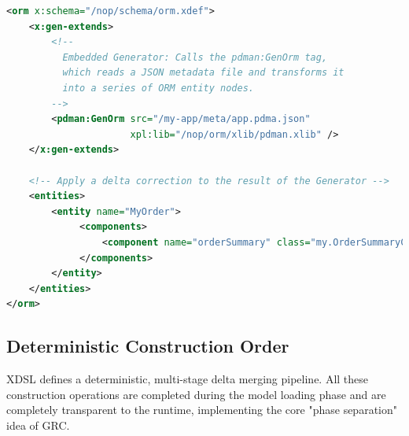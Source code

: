 \documentclass[11pt]{article}
\begin{document}
\begin{lstlisting}[language=XML, caption={Model with an embedded generator}]
<orm x:schema="/nop/schema/orm.xdef">
    <x:gen-extends>
        <!--
          Embedded Generator: Calls the pdman:GenOrm tag,
          which reads a JSON metadata file and transforms it 
          into a series of ORM entity nodes.
        -->
        <pdman:GenOrm src="/my-app/meta/app.pdma.json"
                      xpl:lib="/nop/orm/xlib/pdman.xlib" />
    </x:gen-extends>

    <!-- Apply a delta correction to the result of the Generator -->
    <entities>
        <entity name="MyOrder">
             <components>
                 <component name="orderSummary" class="my.OrderSummaryComponent"/>
             </components>
        </entity>
    </entities>
</orm>
\end{lstlisting}

\subsection{Deterministic Construction Order}
XDSL defines a deterministic, multi-stage delta merging pipeline. All these construction operations are completed during the model loading phase and are completely transparent to the runtime, implementing the core "phase separation" idea of GRC.
\end{document}
